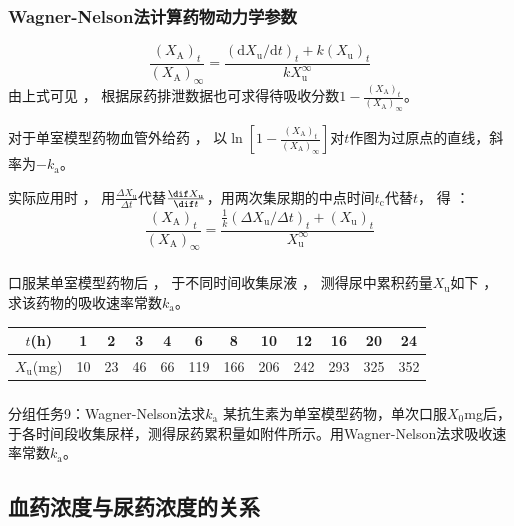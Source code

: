 \documentclass[dvipsnames, svgnames, x11names]{beamer}
\begin{document}
\begin{frame}
    \frametitle{Wagner-Nelson法计算药物动力学参数}
    \[
        \frac{(X_\mathrm{A})_t}{(X_\mathrm{A})_\infty} = \frac{(\mathrm{d}X_\mathrm{u}/\mathrm{d}t)_t + k(X_\mathrm{u})_t}{kX_\mathrm{u}^\infty}
    \]
    由上式可见 ， 根据尿药排泄数据也可求得待吸收分数$1-\frac{(X_\mathrm{A})_t}{(X_\mathrm{A})_\infty}$。
    
    对于单室模型药物血管外给药 ， 以$\ln \left[1-\frac{(X_\mathrm{A})_t}{(X_\mathrm{A})_\infty}\right]$对$t$作图为过原点的直线，斜率为$-k_\mathrm{a}$。

    实际应用时 ， 用$\frac{\Delta X_\mathrm{u}}{\Delta t}$代替$\frac{\dif X_\mathrm{u}}{\dif t}$，用两次集尿期的中点时间$t_\mathrm{c}$代替$t$， 得 ：
    \[
        \frac{(X_\mathrm{A})_t}{(X_\mathrm{A})_\infty} = \frac{\frac{1}{k}(\Delta X_\mathrm{u}/\Delta t)_t + (X_\mathrm{u})_t}{X_\mathrm{u}^\infty}
    \]
\end{frame}


\begin{frame}[t]
    \frametitle{}
    \begin{example}
        口服某单室模型药物后 ， 于不同时间收集尿液 ， 测得尿中累积药量$X_\mathrm{u}$如下 ， 求该药物的吸收速率常数$k_\mathrm{a}$。
        \begin{table}
            \centering
            \small
            \begin{tabular}{cccccccccccc}
                \bottomrule
                $t$(h) & 1 & 2 & 3 & 4 & 6 & 8 & 10 & 12  &  16 & 20  & 24 \\ \hline
                $X_\mathrm{u}$(mg) & 10 & 23 & 46 & 66 & 119 & 166 & 206 & 242 & 293 & 325 & 352  \\ \toprule 
            \end{tabular}
        \end{table}
    \end{example}
\end{frame}


\begin{frame}[t]
    \frametitle{}
    \begin{redblock}{分组任务9：Wagner-Nelson法求$k_\mathrm{a}$}
        某抗生素为单室模型药物，单次口服$X_0$mg后，于各时间段收集尿样，测得尿药累积量如附件所示。用Wagner-Nelson法求吸收速率常数$k_\mathrm{a}$。
    \end{redblock}
\end{frame}


\subsection{血药浓度与尿药浓度的关系}
\end{document}
